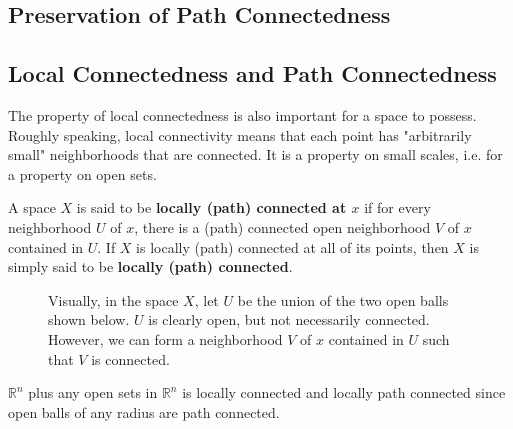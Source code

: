 \subsection{Preservation of Path Connectedness}

\subsection{Local Connectedness and Path Connectedness}

  The property of local connectedness is also important for a space to possess. Roughly speaking, local connectivity means that each point has "arbitrarily small" neighborhoods that are connected. It is a property on small scales, i.e. for a property on open sets. 

  \begin{definition}
    A space $X$ is said to be \textbf{locally (path) connected at $x$} if for every neighborhood $U$ of $x$, there is a (path) connected open neighborhood $V$ of $x$ contained in $U$. If $X$ is locally (path) connected at all of its points, then $X$ is simply said to be \textbf{locally (path) connected}. 

    \begin{figure}[H]
      \centering 
      \caption{Visually, in the space $X$, let $U$ be the union of the two open balls shown below. $U$ is clearly open, but not necessarily connected. However, we can form a  neighborhood $V$ of $x$ contained in $U$ such that $V$ is connected. }
      \label{fig:locally_connected}
    \end{figure}
  \end{definition} 

  \begin{example}
    $\mathbb{R}^n$ plus any open sets in $\mathbb{R}^n$ is locally connected and locally path connected since open balls of any radius are path connected. 
  \end{example} 

